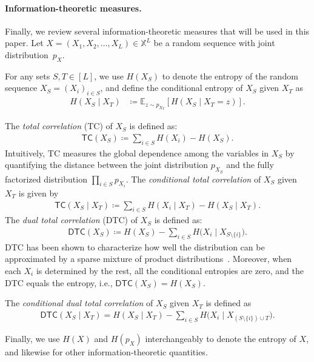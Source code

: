 \documentclass[english]{article}
\newcommand{\defn}{\coloneqq}
\newcommand{\bE}{\mathbb{E}}
\newcommand{\bX}{\mathbb{X}}
\newcommand{\TC}{\mathsf{TC}}
\newcommand{\DTC}{\mathsf{DTC}}
\begin{document}
\paragraph{Information-theoretic measures.}
Finally, we review several information-theoretic measures that will be used in this paper. Let $X = (X_1, X_2, \dots, X_L)\in \bX^L$ be a random sequence with joint distribution~$p_X$. 

For any sets $S,T\in[L]$, we use $H(X_S)$ to denote the entropy of the random sequence $X_S = (X_i)_{i \in S}$, and define the conditional entropy of $X_S$ given $X_T$ as
    \begin{align}
        H(X_S \mid X_T) & \defn \bE_{z\sim p_{X_T}}[H(X_S \mid X_T = z)]. 
    \end{align}

The \textit{total correlation} (TC) of $X_S$ is defined as:
    \begin{align}
    \TC(X_S) \defn \sum_{i \in S} H(X_i) - H(X_S).
    \end{align}
    Intuitively, TC measures the global dependence among the variables in $X_S$ by quantifying the distance between the joint distribution $p_{X_S}$ and the fully factorized distribution $\prod_{i \in S} p_{X_i}$.
The \textit{conditional total correlation} of $X_S$ given $X_T$ is given by
    \begin{align}
        \TC(X_S \mid X_T) \defn \sum_{i \in S} H(X_i \mid X_T) - H(X_S \mid X_T).
    \end{align}
The \textit{dual total correlation} (DTC) of $X_S$ is defined as:
    \begin{align}
        \DTC (X_S) \defn H(X_S) - \sum_{i \in S} H \big(X_i \mid X_{S \setminus \{i\}}\big).
    \end{align}
DTC has been shown to characterize how well the distribution can be approximated by a sparse mixture of product distributions~\citep{austin2018multi,chen2025optimal}.
Moreover, when each $X_i$ is determined by the rest, all the conditional entropies are zero, and the DTC equals the entropy, i.e., $\DTC (X_S) = H(X_S)$.

The \textit{conditional dual total correlation} of $X_S$ given $X_T$ is defined as
    \begin{align}
        \DTC (X_S \mid X_T) = H(X_S \mid X_T) - \sum_{i \in S} H\big(X_i \mid X_{(S \setminus \{i\}) \cup T}\big).
    \end{align}

Finally, we use $H(X)$ and $H(p_X)$ interchangeably to denote the entropy of $X$, and likewise for other information-theoretic quantities.
\end{document}

